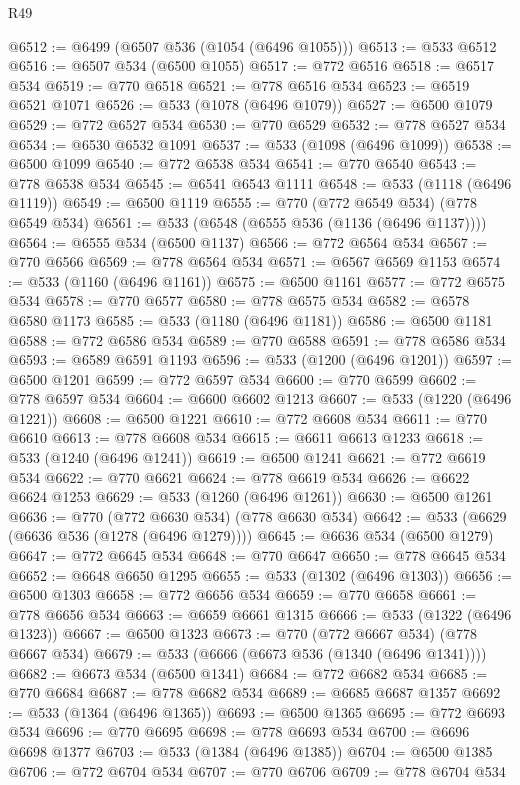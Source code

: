 \begin{lexlean}{R49}
\begin{coremodule}
@6512 := @6499 (@6507 @536 (@1054 (@6496 @1055)))
@6513 := @533 @6512
@6516 := @6507 @534 (@6500 @1055)
@6517 := @772 @6516
@6518 := @6517 @534
@6519 := @770 @6518
@6521 := @778 @6516 @534
@6523 := @6519 @6521 @1071
@6526 := @533 (@1078 (@6496 @1079))
@6527 := @6500 @1079
@6529 := @772 @6527 @534
@6530 := @770 @6529
@6532 := @778 @6527 @534
@6534 := @6530 @6532 @1091
@6537 := @533 (@1098 (@6496 @1099))
@6538 := @6500 @1099
@6540 := @772 @6538 @534
@6541 := @770 @6540
@6543 := @778 @6538 @534
@6545 := @6541 @6543 @1111
@6548 := @533 (@1118 (@6496 @1119))
@6549 := @6500 @1119
@6555 := @770 (@772 @6549 @534) (@778 @6549 @534)
@6561 := @533 (@6548 (@6555 @536 (@1136 (@6496 @1137))))
@6564 := @6555 @534 (@6500 @1137)
@6566 := @772 @6564 @534
@6567 := @770 @6566
@6569 := @778 @6564 @534
@6571 := @6567 @6569 @1153
@6574 := @533 (@1160 (@6496 @1161))
@6575 := @6500 @1161
@6577 := @772 @6575 @534
@6578 := @770 @6577
@6580 := @778 @6575 @534
@6582 := @6578 @6580 @1173
@6585 := @533 (@1180 (@6496 @1181))
@6586 := @6500 @1181
@6588 := @772 @6586 @534
@6589 := @770 @6588
@6591 := @778 @6586 @534
@6593 := @6589 @6591 @1193
@6596 := @533 (@1200 (@6496 @1201))
@6597 := @6500 @1201
@6599 := @772 @6597 @534
@6600 := @770 @6599
@6602 := @778 @6597 @534
@6604 := @6600 @6602 @1213
@6607 := @533 (@1220 (@6496 @1221))
@6608 := @6500 @1221
@6610 := @772 @6608 @534
@6611 := @770 @6610
@6613 := @778 @6608 @534
@6615 := @6611 @6613 @1233
@6618 := @533 (@1240 (@6496 @1241))
@6619 := @6500 @1241
@6621 := @772 @6619 @534
@6622 := @770 @6621
@6624 := @778 @6619 @534
@6626 := @6622 @6624 @1253
@6629 := @533 (@1260 (@6496 @1261))
@6630 := @6500 @1261
@6636 := @770 (@772 @6630 @534) (@778 @6630 @534)
@6642 := @533 (@6629 (@6636 @536 (@1278 (@6496 @1279))))
@6645 := @6636 @534 (@6500 @1279)
@6647 := @772 @6645 @534
@6648 := @770 @6647
@6650 := @778 @6645 @534
@6652 := @6648 @6650 @1295
@6655 := @533 (@1302 (@6496 @1303))
@6656 := @6500 @1303
@6658 := @772 @6656 @534
@6659 := @770 @6658
@6661 := @778 @6656 @534
@6663 := @6659 @6661 @1315
@6666 := @533 (@1322 (@6496 @1323))
@6667 := @6500 @1323
@6673 := @770 (@772 @6667 @534) (@778 @6667 @534)
@6679 := @533 (@6666 (@6673 @536 (@1340 (@6496 @1341))))
@6682 := @6673 @534 (@6500 @1341)
@6684 := @772 @6682 @534
@6685 := @770 @6684
@6687 := @778 @6682 @534
@6689 := @6685 @6687 @1357
@6692 := @533 (@1364 (@6496 @1365))
@6693 := @6500 @1365
@6695 := @772 @6693 @534
@6696 := @770 @6695
@6698 := @778 @6693 @534
@6700 := @6696 @6698 @1377
@6703 := @533 (@1384 (@6496 @1385))
@6704 := @6500 @1385
@6706 := @772 @6704 @534
@6707 := @770 @6706
@6709 := @778 @6704 @534

\end{coremodule}
\end{lexlean}
